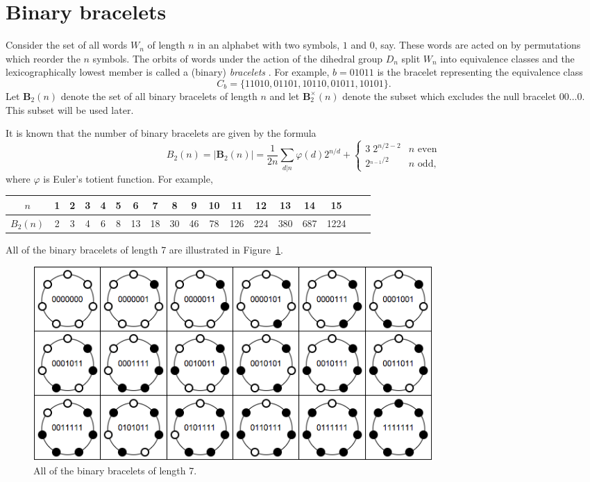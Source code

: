 \documentclass[11pt]{article}
\theoremstyle{definition}
\begin{document}
\section{Binary bracelets}
Consider the set of all words $W_n$ of length $n$ in an alphabet with two symbols, $1$ and $0$, say. These words are acted on by permutations which reorder the $n$ symbols. The orbits of words under the action of the dihedral group $D_n$ split $W_n$ into equivalence classes and the lexicographically lowest member is called a (binary) \emph{bracelets} \cite{}.  For example, $b=01011$ is the bracelet representing the equivalence class
\begin{equation}\label{eq:Cb}
C_b=\{11010,01101,10110,01011,10101\}.	
\end{equation}
Let $\mathbf B_2(n)$ denote the set of all binary bracelets of length $n$ and let $\mathbf B^\times_2 (n)$ denote the subset which excludes the null bracelet $00 \dots 0$. This subset will be used later.

It is known \cite{} that the number of binary bracelets are given by the formula
\begin{equation}
	B_2(n)=|\mathbf B_2(n)|=\frac1{2n}\sum_{d\vert n}\varphi(d)2^{n/d}+  
	\begin{cases}
		3\;2^{n/2-2}&n\text{ even}\\
		2^{_{n-1}/2}&n\text{ odd},
	\end{cases}
\end{equation}
where $\varphi$ is Euler's totient function. For example,
\begin{center}
\begin{tabular}{c|ccccccccccccccccc}
$n$&1&2&3&4&5&6&7&8&9&10&11&12&13&14&15\\
\hline
$B_2(n)$&2&3&4&6&8&13&18&30&46&78&126&224&380&687&1224
\end{tabular}	
\end{center}
All of the binary bracelets of length 7 are illustrated in Figure~\ref{fig:b7}.
\begin{figure}[htbp]
\centering
		\includegraphics[width=6in]{B7.png}
		\caption{All of the binary bracelets of length 7.\label{fig:b7}}
\end{figure}
\end{document}
